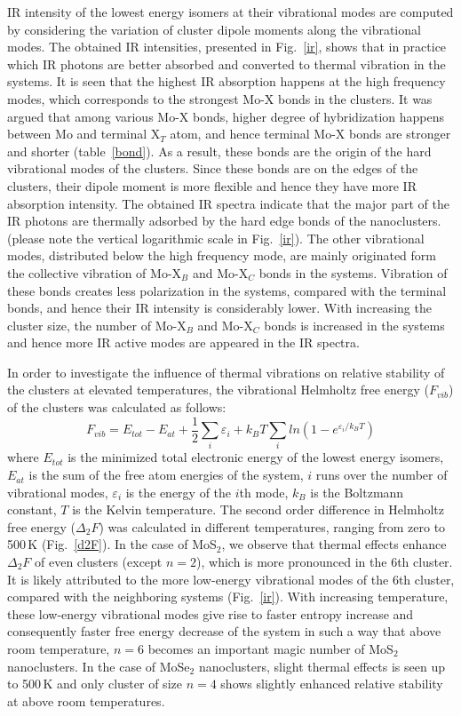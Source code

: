 \documentclass[nofootinbib,10pt,aip,twocolumn,showpacs]{revtex4-1}
\begin{document}
IR intensity of the lowest energy isomers at their vibrational modes
are computed by considering the variation of cluster dipole moments  
along the vibrational modes.
The obtained IR intensities, presented in Fig.~\ref{ir},
shows that in practice which IR photons are better absorbed and 
converted to thermal vibration in the systems.
It is seen that the highest IR absorption happens at the high frequency modes,
which corresponds to the strongest Mo-X bonds in the clusters.
It was argued that among various Mo-X bonds, higher degree of hybridization 
happens between Mo and terminal X$_{T}$ atom, 
and hence terminal Mo-X bonds are stronger and shorter (table~\ref{bond}).
As a result, these bonds are the origin of 
the hard vibrational modes of the clusters.
Since these bonds are on the edges of the clusters, 
their dipole moment is more flexible and hence they have
more IR absorption intensity.
The obtained IR spectra indicate that the major part of the IR photons
are thermally adsorbed by the hard edge bonds of the nanoclusters.
(please note the vertical logarithmic scale in Fig.~\ref{ir}).
The other vibrational modes, distributed below the high frequency mode,
are mainly originated form the collective vibration of 
Mo-X$_B$ and Mo-X$_C$ bonds in the systems.
Vibration of these bonds creates less polarization in the systems,
compared with the terminal bonds,
and hence their IR intensity is considerably lower.
With increasing the cluster size, the number of Mo-X$_B$ and Mo-X$_C$ bonds
is increased in the systems and hence more IR active modes
are appeared in the IR spectra.

In order to investigate the influence of thermal vibrations on 
relative stability of the clusters at elevated temperatures, 
the vibrational Helmholtz free energy ($F_{vib}$) of the clusters
was calculated as follows:
%
\begin{equation}
F_{vib} = E_{tot} - E_{at} + \frac{1}{2}\sum_{i} \varepsilon_i +
          k_BT\sum_{i} ln(1-e^{\varepsilon_{i}/k_BT})
\label{equ-Fvib}
\end{equation}
%
where $E_{tot}$ is the minimized total electronic energy of the lowest energy isomers, 
$E_{at}$ is the sum of the free atom energies of the system, 
$i$ runs over the number of vibrational modes, 
$\varepsilon_{i}$ is the energy of the $i$th mode, 
$k_{B}$ is the Boltzmann constant, $T$ is the Kelvin temperature.
The second order difference in Helmholtz free energy ($\Delta_{2}F$) 
was calculated in different temperatures, 
ranging from zero to 500\,K (Fig.~\ref{d2F}). 
In the case of MoS$_2$, we observe that thermal effects enhance $\Delta_{2}F$ 
of even clusters (except $n=2$), which is more pronounced in the 6th cluster. 
It is likely attributed to the more low-energy vibrational modes of the 6th cluster,
compared with the neighboring systems (Fig.~\ref{ir}). 
With increasing temperature, these low-energy vibrational modes give rise 
to faster entropy increase and consequently faster free energy decrease of 
the system in such a way that above room temperature, 
$n=6$ becomes an important magic number of MoS$_2$ nanoclusters.
In the case of MoSe$_2$ nanoclusters, slight thermal effects 
is seen up to 500\,K and only cluster of size $n=4$ shows 
slightly enhanced relative stability at above room temperatures.
\end{document}
